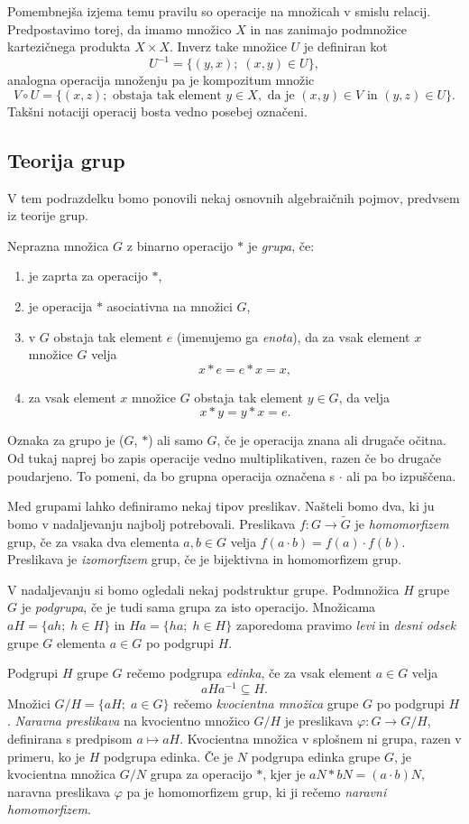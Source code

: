 \documentclass[mat1]{fmfdelo}
\begin{document}
Pomembnejša izjema temu pravilu so operacije na množicah v smislu relacij. Predpostavimo torej, da imamo množico $X$ in nas zanimajo podmnožice kartezičnega produkta $X \times X$. Inverz take množice $U$ je definiran kot \[ U^{-1} = \lbrace (y, x) ;\; (x, y) \in U \rbrace, \]
analogna operacija množenju pa je kompozitum množic \[ V \circ U = \lbrace (x, z) ; \text{ obstaja tak element } y \in X, \text{ da je } (x, y) \in V \text{ in } (y, z) \in U \rbrace. \]
Takšni notaciji operacij bosta vedno posebej označeni.

\subsection{Teorija grup}
V tem podrazdelku bomo ponovili nekaj osnovnih algebraičnih pojmov, predvsem iz teorije grup.

Neprazna množica $G$ z binarno operacijo $*$ je \emph{grupa}, če:
\begin{enumerate}
\item je zaprta za operacijo $*$,
\item je operacija $*$ asociativna na množici $G$,
\item v $G$ obstaja tak element $e$ (imenujemo ga \emph{enota}), da za vsak element $x$ množice $G$ velja \[ x*e = e*x = x, \]
\item za vsak element $x$ množice $G$ obstaja tak element $y \in G$, da velja \[ x*y = y*x = e. \]
\end{enumerate}
Oznaka za grupo je ($G$, $*$) ali samo $G$, če je operacija znana ali drugače očitna. Od tukaj naprej bo zapis operacije vedno multiplikativen, razen če bo drugače poudarjeno. To pomeni, da bo grupna operacija označena s $\cdot$ ali pa bo izpuščena.

Med grupami lahko definiramo nekaj tipov preslikav. Našteli bomo dva, ki ju bomo v nadaljevanju najbolj potrebovali.
Preslikava $f\colon G \to \widetilde{G}$ je \emph{homomorfizem} grup, če za vsaka dva elementa $a, b \in G$ velja $f(a\cdot b) = f(a)\cdot f(b)$.
Preslikava je \emph{izomorfizem} grup, če je bijektivna in homomorfizem grup.

V nadaljevanju si bomo ogledali nekaj podstruktur grupe.
Podmnožica $H$ grupe $G$ je \emph{podgrupa}, če je tudi sama grupa za isto operacijo.
Množicama $aH = \lbrace ah ;\; h \in H \rbrace$ in $Ha = \lbrace ha ;\; h \in H \rbrace$ zaporedoma pravimo \emph{levi} in \emph{desni odsek} grupe $G$ elementa $a \in G$ po podgrupi $H$.

Podgrupi $H$ grupe $G$ rečemo podgrupa \emph{edinka}, če za vsak element $a \in G$ velja \[aHa^{-1} \subseteq H.\]
Množici $G/H = \lbrace aH ;\; a \in G \rbrace$ rečemo \emph{kvocientna množica} grupe $G$ po podgrupi $H$.
\emph{Naravna preslikava} na kvocientno množico $G/H$ je preslikava $\varphi\colon G \to G/H$, definirana s predpisom $a \mapsto aH$.
Kvocientna množica v splošnem ni grupa, razen v primeru, ko je $H$ podgrupa edinka.
Če je $N$ podgrupa edinka grupe $G$, je kvocientna množica $G/N$ grupa za operacijo $*$, kjer je $aN*bN = (a\cdot b)N$, naravna preslikava $\varphi$ pa je homomorfizem grup, ki ji rečemo \emph{naravni homomorfizem}.
\end{document}
